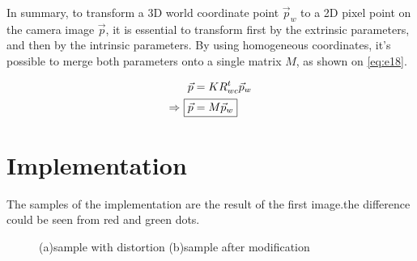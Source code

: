 \documentclass{article}
\begin{document}
In summary, to transform a 3D world coordinate point $\vec{p}_w$ to a 2D pixel point on the camera image $\vec{p}$, it is essential to transform first by the extrinsic parameters, and then by the intrinsic parameters. By using homogeneous coordinates, it's possible to merge both parameters onto a single matrix $M$, as shown on \eqref{eq:e18}.

\begin{alignat}{2}
\nonumber
\vec{p} &= KR^t_{wc} \vec{p}_w \\
\Rightarrow ~ \Aboxed{\vec{p} &= M \vec{p}_w} \label{eq:e18}
\end{alignat}

\newpage
\section{Implementation}
The samples of the implementation are the result of the first image.the difference could be seen from red and green dots.
\begin{figure}[ht]
 \centerline
 {
  \qquad
 }
 \caption[Color inversion]{(a)sample with distortion (b)sample after modification}
 \label{fig:inversion}
\end{figure}








\end{document}
